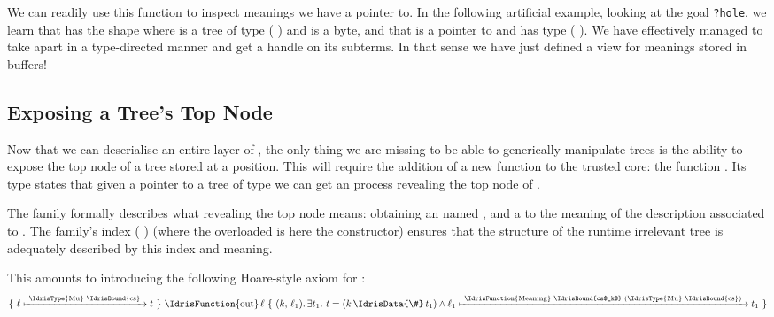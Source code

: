 We can readily use this function to inspect meanings
we have a pointer to. In the following artificial example,
looking at the goal \texttt{?hole}, we learn that
 has the shape {\IdrisKeyword{(} \IdrisData{\#} \IdrisKeyword{(} \IdrisData{\#} \IdrisKeyword{))}}
where  is a tree of type ( )
and  is a byte, and that
 is a pointer to 
and  has type ( ).
We have effectively managed to take  apart in a
type-directed manner and get a handle on its subterms.
In that sense we have just defined a view for meanings stored in buffers!

\subsection{Exposing a Tree's Top Node}

Now that we can deserialise an entire layer of ,
the only thing we are missing to be able to generically manipulate trees
is the ability to expose the top node of a tree stored at a
 position.
%
This will require the addition of a new function to the trusted core:
the function .
%
Its type states that given a pointer
to a tree  of type  we can get an
 process revealing the top node of .


The  family formally describes what revealing the
top node means:
obtaining an  named ,
and a  to the meaning
 of the description associated to .
%
The family's index ( \IdrisData{\#} )
(where the overloaded \IdrisData{(\#)} is here the
 constructor)
ensures that the structure of the runtime irrelevant
tree is adequately described by this index and meaning.


This amounts to introducing the following Hoare-style axiom for
:
\[
\Hoare
    {\Pointer{\ell}{\text{\IdrisType{Mu} \IdrisBound{cs}}}{t}}
    {\text{\IdrisFunction{out}}\,\ell}
    {(k,\, \ell_1)}
    {\exists t_1.~ t = (k \,\text{\IdrisData{\#}}\, t_1)
      \wedge \Pointer{\ell_1}{\text{\IdrisFunction{Meaning} \IdrisBound{cs$_k$} (\IdrisType{Mu} \IdrisBound{cs})}}{t_1}}
\]

